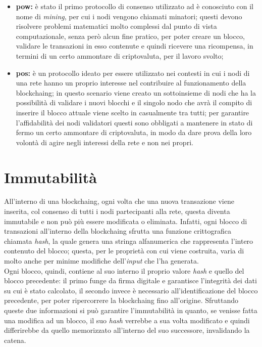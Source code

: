 \begin{itemize}
	\item \textbf{\gls{pow}:} è stato il primo protocollo di consenso utilizzato ad è conosciuto con il nome di \textit{mining}, per cui i nodi vengono chiamati minatori; questi devono risolvere problemi matematici molto complessi dal punto di vista computazionale, senza però alcun fine pratico, per poter creare un blocco, validare le transazioni in esso contenute e quindi ricevere una ricompensa, in termini di un certo ammontare di criptovaluta, per il lavoro svolto;
	\item \textbf{\gls{pos}:} è un protocollo ideato per essere utilizzato nei contesti in cui i nodi di una rete hanno un proprio interesse nel contribuire al funzionamento della \gls{blockchaing}; in questo scenario viene creato un sottoinsieme di nodi che ha la possibilità di validare i nuovi blocchi e il singolo nodo che avrà il compito di inserire il blocco attuale viene scelto in casualmente tra tutti; per garantire l'affidabilità dei nodi validatori questi sono obbligati a mantenere in stato di fermo un certo ammontare di criptovaluta, in modo da dare prova della loro volontà di agire negli interessi della rete e non nei propri.
\end{itemize}

\section{Immutabilità}

All'interno di una \gls{blockchaing}, ogni volta che una nuova transazione viene inserita, col consenso di tutti i nodi partecipanti alla rete, questa diventa immutabile e non può più essere modificata o eliminata. Infatti, ogni blocco di transazioni all'interno della \gls{blockchaing} sfrutta una funzione crittografica chiamata \textit{hash}, la quale genera una stringa alfanumerica che rappresenta l'intero contenuto del blocco; questa, per le proprietà con cui viene costruita, varia di molto anche per minime modifiche dell'\textit{input} che l'ha generata.\\
Ogni blocco, quindi, contiene al suo interno il proprio valore \textit{hash} e quello del blocco precedente: il primo funge da firma digitale e garantisce l'integrità dei dati su cui è stato calcolato, il secondo invece è necessario all'identificazione del blocco precedente, per poter ripercorrere la \gls{blockchaing} fino all'origine. Sfruttando queste due informazioni si può garantire l'immutabilità in quanto, se venisse fatta una modifica ad un blocco, il suo \textit{hash} verrebbe a sua volta modificato e quindi differirebbe da quello memorizzato all'interno del suo successore, invalidando la catena.

